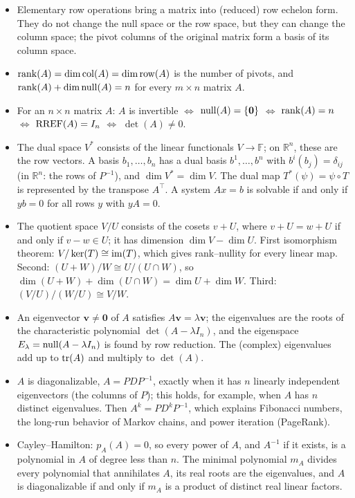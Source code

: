 \begin{itemize}[leftmargin=*]
	\item Elementary row operations bring a matrix into (reduced) row echelon form. They do not change the null space or the row space, but they can change the column space; the pivot columns of the original matrix form a basis of its column space.
	\item $\operatorname{rank}(A) = \dim \operatorname{col}(A) = \dim \operatorname{row}(A)$ is the number of pivots, and $\operatorname{rank}(A) + \dim \operatorname{null}(A) = n$ for every $m \times n$ matrix $A$.
	\item For an $n \times n$ matrix $A$: $A$ is invertible $\iff$ $\operatorname{null}(A) = \{\mathbf{0}\}$ $\iff$ $\operatorname{rank}(A) = n$ $\iff$ $\operatorname{RREF}(A) = I_n$ $\iff$ $\det(A) \neq 0$.
	\item The dual space $V^*$ consists of the linear functionals $V \to \mathbb{F}$; on $\mathbb{R}^n$, these are the row vectors. A basis $b_1, \ldots, b_n$ has a dual basis $b^1, \ldots, b^n$ with $b^i(b_j) = \delta_{ij}$ (in $\mathbb{R}^n$: the rows of $P^{-1}$), and $\dim V^* = \dim V$. The dual map $T^*(\psi) = \psi \circ T$ is represented by the transpose $A^\top$. A system $Ax = b$ is solvable if and only if $yb = 0$ for all rows $y$ with $yA = 0$.
	\item The quotient space $V/U$ consists of the cosets $v + U$, where $v + U = w + U$ if and only if $v - w \in U$; it has dimension $\dim V - \dim U$. First isomorphism theorem: $V/\ker(T) \cong \operatorname{im}(T)$, which gives rank--nullity for every linear map. Second: $(U + W)/W \cong U/(U \cap W)$, so $\dim(U + W) + \dim(U \cap W) = \dim U + \dim W$. Third: $(V/U)/(W/U) \cong V/W$.
	\item An eigenvector $\mathbf{v} \neq \mathbf{0}$ of $A$ satisfies $A\mathbf{v} = \lambda \mathbf{v}$; the eigenvalues are the roots of the characteristic polynomial $\det(A - \lambda I_n)$, and the eigenspace $E_\lambda = \operatorname{null}(A - \lambda I_n)$ is found by row reduction. The (complex) eigenvalues add up to $\operatorname{tr}(A)$ and multiply to $\det(A)$.
	\item $A$ is diagonalizable, $A = PDP^{-1}$, exactly when it has $n$ linearly independent eigenvectors (the columns of $P$); this holds, for example, when $A$ has $n$ distinct eigenvalues. Then $A^k = PD^kP^{-1}$, which explains Fibonacci numbers, the long-run behavior of Markov chains, and power iteration (PageRank).
	\item Cayley--Hamilton: $p_A(A) = 0$, so every power of $A$, and $A^{-1}$ if it exists, is a polynomial in $A$ of degree less than $n$. The minimal polynomial $m_A$ divides every polynomial that annihilates $A$, its real roots are the eigenvalues, and $A$ is diagonalizable if and only if $m_A$ is a product of distinct real linear factors.

\end{itemize}
